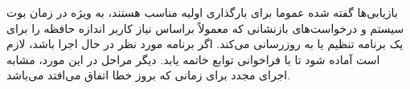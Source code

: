\documentclass[10pt, a4paper]{article}
\begin{document}
بازیابی‌ها گفته شده عموما برای بارگذاری اولیه مناسب هستند، به ویژه در زمان بوت 
سیستم و درخواست‌های بازنشانی که معمولاً براساس نیاز کاربر اندازه حافظه را برای
یک برنامه تنظیم یا به روزرسانی می‌کند. اگر برنامه مورد نظر در حال اجرا باشد،
لازم است آماده شود تا با فراخوانی توابع  خاتمه یابد. دیگر مراحل در
این مورد، مشابه اجرای مجدد برای زمانی که بروز خطا اتفاق می‌افتد می‌باشد.







\newpage


\end{document}
